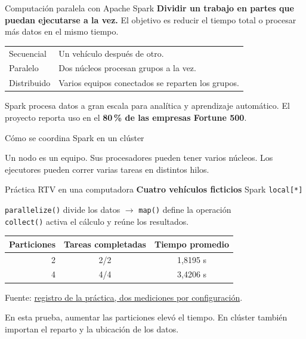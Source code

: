 \begin{frame}{Computación paralela con Apache Spark}
	\textbf{Dividir un trabajo en partes que puedan ejecutarse a la vez.}
	El objetivo es reducir el tiempo total o procesar más datos en el mismo tiempo. \cite{girTraff2026}
	
	\medskip
	\begin{tabular}{@{}ll@{}}
		\toprule
		Secuencial & Un vehículo después de otro.\\
		Paralelo & Dos núcleos procesan grupos a la vez.\\
		Distribuido & Varios equipos conectados se reparten los grupos.\\
		\bottomrule
	\end{tabular}
	
	\medskip
	Spark procesa datos a gran escala para analítica y aprendizaje automático.
	El proyecto reporta uso en el \textbf{80\,\% de las empresas Fortune 500}. \cite{girSparkHome}
\end{frame}

\begin{frame}{Cómo se coordina Spark en un clúster}
	\centering
	
	
	\medskip
	\small Un nodo es un equipo. Sus procesadores pueden tener varios núcleos.
	Los ejecutores pueden correr varias tareas en distintos hilos. \cite{girSparkCluster,girSparkYarn}
\end{frame}

\begin{frame}{Práctica RTV en una computadora}
	\textbf{Cuatro vehículos ficticios} \quad Spark \texttt{local[*]}
	
	\medskip
	\texttt{parallelize()} divide los datos \(\rightarrow\)
	\texttt{map()} define la operación\\
	\texttt{collect()} activa el cálculo y reúne los resultados. \cite{girSparkRdd}
	
	\medskip
	\begin{tabular}{@{}rcc@{}}
		\toprule
		Particiones & Tareas completadas & Tiempo promedio\\
		\midrule
		2 & 2/2 & 1,8195 s\\
		4 & 4/4 & 3,4206 s\\
		\bottomrule
	\end{tabular}
	
	\smallskip
	{\footnotesize Fuente: \href{https://github.com/BryanLomb/GA-SUM-01-EXP-1-Exposicion-1er-Corte-Analisis-de-un-Sistema-Distribuido-Real/commit/b998007a13fb2a36c58156077c1bd705cc9a2854}{registro de la práctica, dos mediciones por configuración}.}
	
	\medskip
	En esta prueba, aumentar las particiones elevó el tiempo. En clúster también importan el reparto y la ubicación de los datos. \cite{girSparkPartitions,girSparkLocality}
\end{frame}
